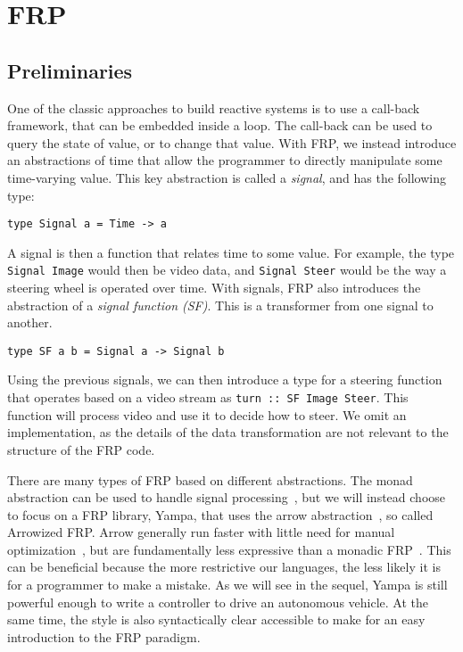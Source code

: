 \section{FRP}

\subsection{Preliminaries}

One of the classic approaches to build reactive systems is to use a call-back framework, that can be embedded inside a loop.
The call-back can be used to query the state of value, or to change that value.
With FRP, we instead introduce an abstractions of time that allow the programmer to directly manipulate some time-varying value.
This key abstraction is called a \textit{signal}, and has the following type:

\begin{lstlisting}
type Signal a = Time -> a
\end{lstlisting}

A signal is then a function that relates time to some value.
For example, the type \texttt{Signal Image} would then be video data, and \texttt{Signal Steer} would be the way a steering wheel is operated over time.
With signals, FRP also introduces the abstraction of a \textit{signal function (SF)}.
This is a transformer from one signal to another.

\begin{lstlisting}
type SF a b = Signal a -> Signal b
\end{lstlisting}

Using the previous signals, we can then introduce a type for a steering function that operates based on a video stream as \texttt{turn :: SF Image Steer}.
This function will process video and use it to decide how to steer.
We omit an implementation, as the details of the data transformation are not relevant to the structure of the FRP code.

There are many types of FRP based on different abstractions.
The monad abstraction can be used to handle signal processing~\cite{van2014monadic},
 but we will instead choose to focus on a FRP library, Yampa, that uses the arrow abstraction~\cite{hudak2003arrows}, so called Arrowized FRP.
Arrow generally run faster with little need for manual optimization~\cite{yallop2016causal}, but are fundamentally less expressive than a monadic FRP~\cite{lindley2011idioms}.
This can be beneficial because the more restrictive our languages, the less likely it is for a programmer to make a mistake.
As we will see in the sequel, Yampa is still powerful enough to write a controller to drive an autonomous vehicle.
At the same time, the style is also syntactically clear accessible to make for an easy introduction to the FRP paradigm.

